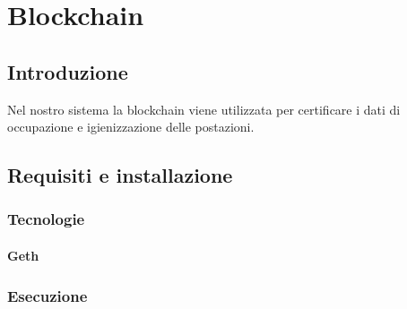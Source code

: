 \section{Blockchain}

\subsection{Introduzione}
Nel nostro sistema la blockchain viene utilizzata per certificare i dati di occupazione e igienizzazione delle postazioni.

\subsection{Requisiti e installazione}

\subsubsection{Tecnologie}
\paragraph{Geth}

\subsubsection{Esecuzione}
